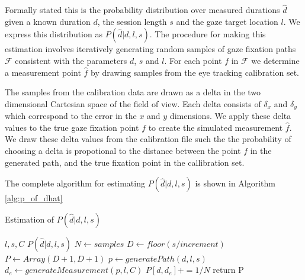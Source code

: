 \documentclass[sigconf]{acmart}
\numberwithin{equation}{section}
\begin{document}
Formally stated this is the probability distribution over measured durations $\hat{d}$ given a
known duration $d$, the session length $s$ and the gaze target location $l$. 
We express this distribution as $P(\hat{d}|d,l,s)$. The
procedure for making this estimation involves iteratively generating random samples
of gaze fixation paths $\mathcal{F}$ consistent with the parameters $d$, $s$ and $l$. 
For each point $f$ in $\mathcal{F}$ we determine a measurement point $\hat{f}$ 
by drawing samples from the eye tracking calibration set.
 
The samples from the calibration data are drawn as a delta in the two dimensional Cartesian
space of the field of view. Each delta consists of $\delta_x$ and $\delta_y$ which correspond
to the error in the $x$ and $y$ dimensions. We apply these delta values to the true gaze 
fixation point $f$ to create the simulated measurement $\hat{f}$.
We draw these delta values from the calibration file such the
the probability of choosing a delta is propotional to the distance between the point $f$
in the generated path, and the true fixation point in the callibration set. 

The complete algorithm for estimating $P(\hat{d}|d,l,s)$ is shown in Algorithm \ref{alg:p_of_dhat}    

\begin{algorithm}
\caption{Estimation of $P(\hat{d}|d,l,s)$}\label{alg:p_of_dhat}
\begin{algorithmic}
  \Require $l,s,C$
  \Ensure $P(\hat{d}|d,l,s)$
  \State $N \gets samples$              
  \State $D \gets floor(s / increment)$ 
  \State $P \gets Array(D+1,D+1)$       
                    
                    
      \State $p \gets generatePath(d,l,s)$
      \State $d_e \gets generateMeasurement(p,l,C)$  
      \State $P[d,d_e] += 1/N$          
    \EndFor
  \EndFor
  \State return P
\end{algorithmic}
\end{algorithm}
\end{document}
